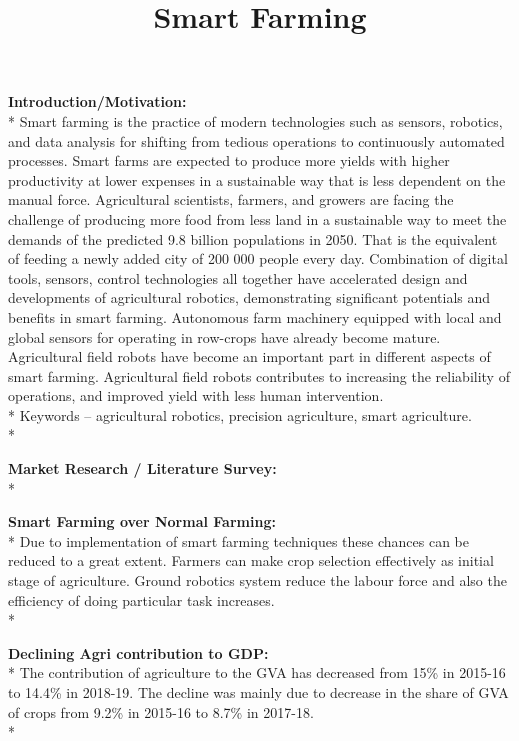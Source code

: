 \documentclass[12pt]{article}
\begin{document}
\title{Smart Farming}	
\maketitle

 \textbf{Introduction/Motivation:} 
\\* Smart farming is the practice of modern technologies such as sensors, robotics, and data analysis for shifting from tedious operations to continuously automated processes. 
Smart farms are expected to produce more yields with higher productivity at lower
expenses in a sustainable way that is less dependent on the manual force. Agricultural scientists, farmers, and growers are facing the challenge of producing more food from less land in a sustainable way to meet the demands of the predicted 9.8 billion populations in 2050. That is the equivalent of feeding a newly added city of 200 000 people every day. Combination of digital tools, sensors, control technologies all together have accelerated design and developments of agricultural robotics, demonstrating significant potentials and benefits in smart farming. Autonomous farm machinery equipped with local and global sensors for operating in row-crops have already become mature. Agricultural field robots  have become an important part in different aspects of smart farming. Agricultural field robots contributes to increasing the reliability of operations,  and improved yield with less human intervention. \\*
Keywords – agricultural robotics, precision agriculture, smart agriculture.\\*


\textbf{Market Research / Literature Survey:} \\*

\textbf{Smart Farming over Normal Farming:} \\*
Due to implementation of smart farming techniques these chances can be reduced to a great extent. Farmers can make crop selection effectively as initial stage of agriculture. Ground robotics system reduce the labour force and also the efficiency of doing particular task increases. \\*

\textbf{Declining Agri contribution to GDP:} \\*
The contribution of agriculture to the GVA has decreased from 15\% in 2015-16 to 14.4\% in 2018-19. The decline was mainly due to decrease in the share of GVA of crops from 9.2\% in 2015-16 to 8.7\% in 2017-18. \\*
\end{document}
